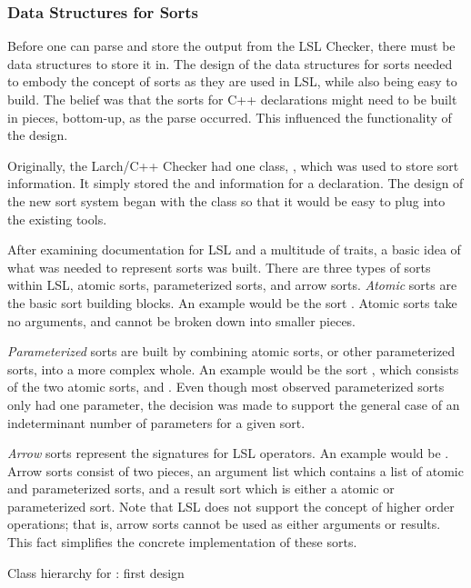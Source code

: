 \subsubsection{Data Structures for Sorts}
Before one can parse and store the output from the LSL Checker, there
must be data structures to store it in. The design of the data
structures for sorts needed to embody the concept of sorts as they are
used in LSL, while also being easy to build. The belief was that the
sorts for C++ declarations might need to be built in pieces,
bottom-up, as the parse occurred. This influenced the functionality of
the design.

Originally, the Larch/C++ Checker had one class, ,
which was used to store sort information. It simply stored the
 and  information for a
declaration. The design of the new sort system began with the
 class so that it would be easy to plug into the
existing tools.

After examining documentation for LSL and a multitude of traits, a
basic idea of what was needed to represent sorts was built. There are
three types of sorts within LSL, atomic sorts, parameterized sorts,
and arrow sorts. \emph{Atomic} sorts are the basic sort building
blocks. An example would be the sort . Atomic sorts take
no arguments, and cannot be broken down into smaller
pieces. 


\emph{Parameterized} sorts are built by combining atomic sorts, or
other parameterized sorts, into a more complex whole. An example would
be the sort
, which consists of the two atomic sorts,
 and . Even though most observed
parameterized sorts only had one parameter, the decision was made to
support the general case of an indeterminant number of parameters for a
given sort.

\emph{Arrow} sorts represent the signatures for LSL operators. An
example would be . Arrow sorts consist of
two pieces, an argument list which contains a list of atomic and
parameterized sorts, and a result sort which is either a atomic or
parameterized sort. Note that LSL does not support the concept of
higher order operations; that is, arrow sorts cannot be used as either
arguments or results. This fact simplifies the concrete implementation
of these sorts.

\begin{BFIGURE}
\begin{center}

\end{center}
\caption{Class hierarchy for : first design}
\label{classfirst}
\end{BFIGURE}

